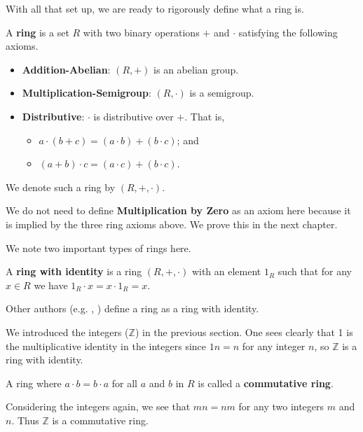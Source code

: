 With all that set up, we are ready to rigorously define what a ring is.
\begin{definition}
    A \textbf{ring} is a set $R$ with two binary operations $+$ and $\cdot$ satisfying the following axioms.
    \begin{itemize}
        \item \textbf{Addition-Abelian}: $(R, +)$ is an abelian group.
        \item \textbf{Multiplication-Semigroup}: $(R, \cdot)$ is a semigroup.
        \item \textbf{Distributive}: $\cdot$ is distributive over $+$. That is,
        \begin{itemize}
            \item $a \cdot (b + c) = (a \cdot b) + (b \cdot c)$; and
            \item $(a + b) \cdot c = (a \cdot c) + (b \cdot c)$.
        \end{itemize}
    \end{itemize}
    We denote such a ring by $(R, +, \cdot)$.
\end{definition}
\begin{remark}
    We do not need to define \textbf{Multiplication by Zero} as an axiom here because it is implied by the three ring axioms above. We prove this in the next chapter.
\end{remark}

We note two important types of rings here.
\begin{definition}
    A \textbf{ring with identity} is a ring $(R, +, \cdot)$ with an element $1_R$ such that for any $x \in R$ we have $1_R \cdot x = x \cdot 1_R = x$.
\end{definition}
\begin{remark}
    Other authors (e.g. \cite[p.~136]{cohn_1982}, \cite[pp.~145--146]{clark_1984}) define a ring as a ring with identity.
\end{remark}
\begin{example}
    We introduced the integers ($\mathbb{Z}$) in the previous section. One sees clearly that 1 is the multiplicative identity in the integers since $1n = n$ for any integer $n$, so $\mathbb{Z}$ is a ring with identity.
\end{example}

\begin{definition}
    A ring where $a \cdot b = b \cdot a$ for all $a$ and $b$ in $R$ is called a \textbf{commutative ring}.
\end{definition}
\begin{example}
    Considering the integers again, we see that $mn = nm$ for any two integers $m$ and $n$. Thus $\mathbb{Z}$ is a commutative ring.
\end{example}

